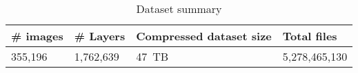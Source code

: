 
\begin{table}
	\scriptsize
	\caption{Dataset summary} \label{tab-dataset-summary}
	\begin{tabular}{|p{}|p{}|p{}|p{}|}%
		\hline
		\# images & \# Layers & Compressed dataset size  &  Total files \\
		\hline
		355,196               & 1,762,639             & 47~TB           & 5,278,465,130  \\
		\hline
	\end{tabular}
\end{table}

